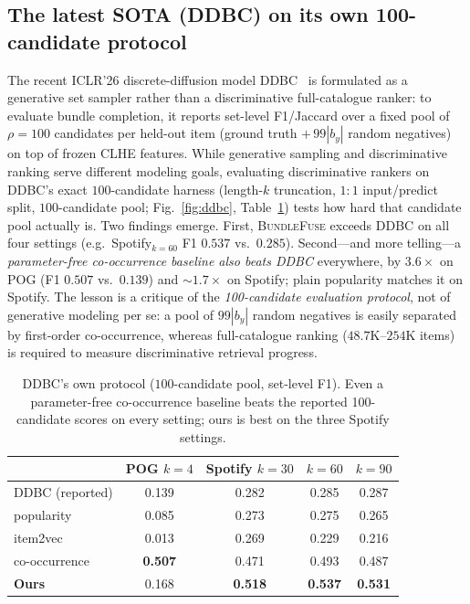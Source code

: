 \subsection{The latest SOTA (DDBC) on its own 100-candidate protocol}
\label{sec:ddbc}
The recent ICLR'26 discrete-diffusion model DDBC~\cite{ddbc} is formulated as a generative set sampler rather than
a discriminative full-catalogue ranker: to evaluate bundle completion, it reports set-level F1/Jaccard over a fixed
pool of $\rho{=}100$ candidates per held-out item (ground truth $+\,99|b_y|$ random negatives) on top of frozen
CLHE features. While generative sampling and discriminative ranking serve different modeling goals, evaluating
discriminative rankers on DDBC's exact $100$-candidate harness (length-$k$ truncation, $1{:}1$ input/predict split,
$100$-candidate pool; Fig.~\ref{fig:ddbc}, Table~\ref{tab:ddbc}) tests how hard that candidate pool actually is.
Two findings emerge. First, \textsc{BundleFuse} exceeds DDBC on all four settings (e.g.\ Spotify$_{k=60}$ F1 $0.537$
vs.\ $0.285$). Second---and more telling---a \emph{parameter-free co-occurrence baseline also beats DDBC}
everywhere, by $3.6\times$ on POG (F1 $0.507$ vs.\ $0.139$) and ${\sim}1.7\times$ on Spotify; plain popularity
matches it on Spotify. The lesson is a critique of the \emph{100-candidate evaluation protocol}, not of generative
modeling per se: a pool of $99|b_y|$ random negatives is easily separated by first-order co-occurrence, whereas
full-catalogue ranking ($48.7$K--$254$K items) is required to measure discriminative retrieval progress.

\begin{table}[t]\centering\small
\caption{DDBC's own protocol ($100$-candidate pool, set-level F1). Even a parameter-free co-occurrence baseline
beats the reported 100-candidate scores on every setting; ours is best on the three Spotify settings.}
\label{tab:ddbc}
\begin{tabular}{lcccc}
\toprule
 & POG $k{=}4$ & Spotify $k{=}30$ & $k{=}60$ & $k{=}90$ \\
\midrule
DDBC (reported) & 0.139 & 0.282 & 0.285 & 0.287 \\
popularity      & 0.085 & 0.273 & 0.275 & 0.265 \\
item2vec        & 0.013 & 0.269 & 0.229 & 0.216 \\
co-occurrence   & \textbf{0.507} & 0.471 & 0.493 & 0.487 \\
\textbf{Ours}   & 0.168 & \textbf{0.518} & \textbf{0.537} & \textbf{0.531} \\
\bottomrule
\end{tabular}
\end{table}

